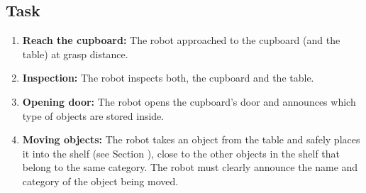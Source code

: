 \subsection{Task}
\begin{enumerate}
\item \textbf{Reach the cupboard:} The robot approached to the cupboard (and the table) at grasp distance.
\item \textbf{Inspection:} The robot inspects both, the cupboard and the table.
\item \textbf{Opening door:} The robot opens the cupboard's door and announces which type of objects are stored inside.
\item \textbf{Moving objects:} The robot takes an object from the table and safely places it into the shelf (see Section ), close to the other objects in the shelf that belong to the same category. The robot must clearly announce the name and category of the object being moved.
\end{enumerate}

